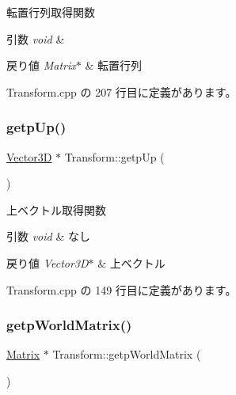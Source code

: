 転置行列取得関数 


\begin{DoxyParams}{引数}
{\em void} & \\
\hline
\end{DoxyParams}

\begin{DoxyRetVals}{戻り値}
{\em Matrix$\ast$} & 転置行列 \\
\hline
\end{DoxyRetVals}


 Transform.\+cpp の 207 行目に定義があります。

\mbox{\label{class_transform_a98796d7ad6726567b5b12ab65254a79d}} 
\subsubsection{\texorpdfstring{getp\+Up()}{getpUp()}}
{\footnotesize\ttfamily \mbox{\hyperlink{class_vector3_d}{Vector3D}} $\ast$ Transform\+::getp\+Up (\begin{DoxyParamCaption}{ }\end{DoxyParamCaption})}



上ベクトル取得関数 


\begin{DoxyParams}{引数}
{\em void} & なし \\
\hline
\end{DoxyParams}

\begin{DoxyRetVals}{戻り値}
{\em Vector3\+D$\ast$} & 上ベクトル \\
\hline
\end{DoxyRetVals}


 Transform.\+cpp の 149 行目に定義があります。

\mbox{\label{class_transform_a58114e02f195f91f9bb807d49c34fe32}} 
\subsubsection{\texorpdfstring{getp\+World\+Matrix()}{getpWorldMatrix()}}
{\footnotesize\ttfamily \mbox{\hyperlink{class_matrix}{Matrix}} $\ast$ Transform\+::getp\+World\+Matrix (\begin{DoxyParamCaption}{ }\end{DoxyParamCaption})}



